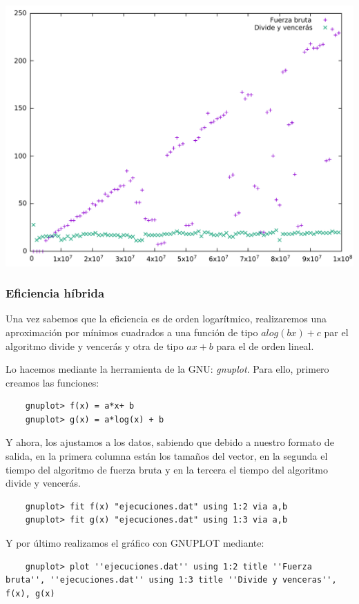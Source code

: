 \documentclass[a4paper, 11pt]{article}
\begin{document}
\begin{center}
	\includegraphics[scale=0.5]{imagen1.pdf}
\end{center}

\subsubsection{Eficiencia híbrida}
Una vez sabemos que la eficiencia es de orden logarítmico, realizaremos una aproximación por mínimos cuadrados a una función de tipo $alog(bx) + c$ par el algoritmo divide y vencerás y otra de tipo $ax + b$ para el de orden lineal.

Lo hacemos mediante la herramienta de la GNU: \emph{gnuplot}.
Para ello, primero creamos las funciones:
\begin{lstlisting}
	gnuplot> f(x) = a*x+ b
	gnuplot> g(x) = a*log(x) + b
\end{lstlisting}

Y ahora, los ajustamos a los datos, sabiendo que debido a nuestro formato de salida, en la primera columna están los tamaños del vector, en la segunda el tiempo del algoritmo de fuerza bruta y en la tercera el tiempo del algoritmo divide y vencerás.

\begin{lstlisting}
	gnuplot> fit f(x) "ejecuciones.dat" using 1:2 via a,b
	gnuplot> fit g(x) "ejecuciones.dat" using 1:3 via a,b
\end{lstlisting}

Y por último realizamos el gráfico con GNUPLOT mediante:
\begin{lstlisting}
	gnuplot> plot ''ejecuciones.dat'' using 1:2 title ''Fuerza bruta'', ''ejecuciones.dat'' using 1:3 title ''Divide y venceras'', f(x), g(x)
\end{lstlisting}
\end{document}
